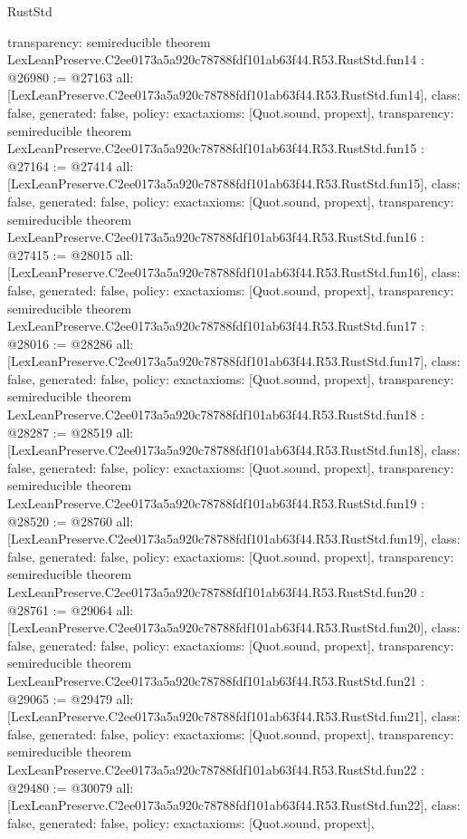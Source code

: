 \begin{lexlean}{RustStd}
\begin{coremodule}
{  transparency: semireducible
}
theorem LexLeanPreserve.C2ee0173a5a920c78788fdf101ab63f44.R53.RustStd.fun14 : @26980 := @27163 {
  all: [LexLeanPreserve.C2ee0173a5a920c78788fdf101ab63f44.R53.RustStd.fun14],
  class: false,
  generated: false,
  policy: exact{axioms: [Quot.sound, propext]},
  transparency: semireducible
}
theorem LexLeanPreserve.C2ee0173a5a920c78788fdf101ab63f44.R53.RustStd.fun15 : @27164 := @27414 {
  all: [LexLeanPreserve.C2ee0173a5a920c78788fdf101ab63f44.R53.RustStd.fun15],
  class: false,
  generated: false,
  policy: exact{axioms: [Quot.sound, propext]},
  transparency: semireducible
}
theorem LexLeanPreserve.C2ee0173a5a920c78788fdf101ab63f44.R53.RustStd.fun16 : @27415 := @28015 {
  all: [LexLeanPreserve.C2ee0173a5a920c78788fdf101ab63f44.R53.RustStd.fun16],
  class: false,
  generated: false,
  policy: exact{axioms: [Quot.sound, propext]},
  transparency: semireducible
}
theorem LexLeanPreserve.C2ee0173a5a920c78788fdf101ab63f44.R53.RustStd.fun17 : @28016 := @28286 {
  all: [LexLeanPreserve.C2ee0173a5a920c78788fdf101ab63f44.R53.RustStd.fun17],
  class: false,
  generated: false,
  policy: exact{axioms: [Quot.sound, propext]},
  transparency: semireducible
}
theorem LexLeanPreserve.C2ee0173a5a920c78788fdf101ab63f44.R53.RustStd.fun18 : @28287 := @28519 {
  all: [LexLeanPreserve.C2ee0173a5a920c78788fdf101ab63f44.R53.RustStd.fun18],
  class: false,
  generated: false,
  policy: exact{axioms: [Quot.sound, propext]},
  transparency: semireducible
}
theorem LexLeanPreserve.C2ee0173a5a920c78788fdf101ab63f44.R53.RustStd.fun19 : @28520 := @28760 {
  all: [LexLeanPreserve.C2ee0173a5a920c78788fdf101ab63f44.R53.RustStd.fun19],
  class: false,
  generated: false,
  policy: exact{axioms: [Quot.sound, propext]},
  transparency: semireducible
}
theorem LexLeanPreserve.C2ee0173a5a920c78788fdf101ab63f44.R53.RustStd.fun20 : @28761 := @29064 {
  all: [LexLeanPreserve.C2ee0173a5a920c78788fdf101ab63f44.R53.RustStd.fun20],
  class: false,
  generated: false,
  policy: exact{axioms: [Quot.sound, propext]},
  transparency: semireducible
}
theorem LexLeanPreserve.C2ee0173a5a920c78788fdf101ab63f44.R53.RustStd.fun21 : @29065 := @29479 {
  all: [LexLeanPreserve.C2ee0173a5a920c78788fdf101ab63f44.R53.RustStd.fun21],
  class: false,
  generated: false,
  policy: exact{axioms: [Quot.sound, propext]},
  transparency: semireducible
}
theorem LexLeanPreserve.C2ee0173a5a920c78788fdf101ab63f44.R53.RustStd.fun22 : @29480 := @30079 {
  all: [LexLeanPreserve.C2ee0173a5a920c78788fdf101ab63f44.R53.RustStd.fun22],
  class: false,
  generated: false,
  policy: exact{axioms: [Quot.sound, propext]},
}
\end{coremodule}
\end{lexlean}
